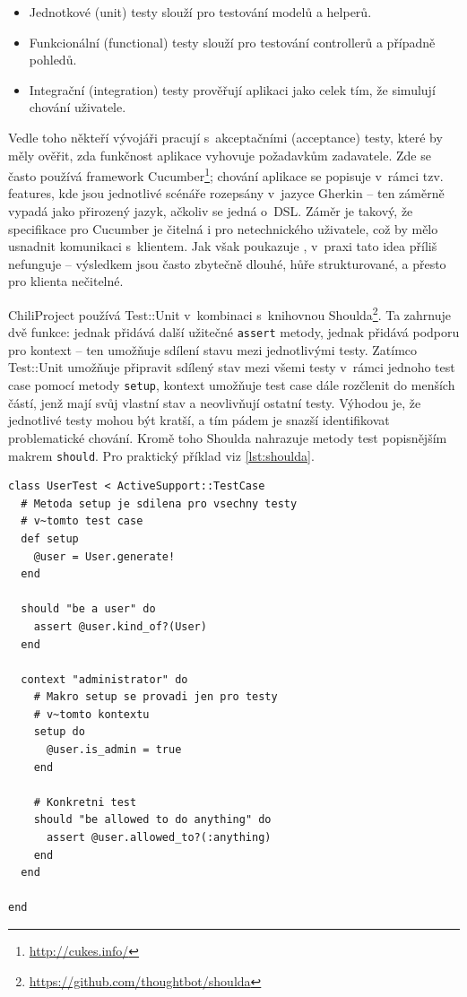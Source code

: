\documentclass[thesis=B,czech]{FITthesis}[2012/05/02]
\begin{document}
\begin{itemize}
\item
  Jednotkové (unit) testy slouží pro testování modelů a helperů.
\item
  Funkcionální (functional) testy slouží pro testování controllerů a
  případně pohledů.
\item
  Integrační (integration) testy prověřují aplikaci jako celek tím, že
  simulují chování uživatele.
\end{itemize}
Vedle toho někteří vývojáři pracují s~akceptačními (acceptance) testy,
které by měly ověřit, zda funkčnost aplikace vyhovuje požadavkům
zadavatele. Zde se často používá framework Cucumber\footnote{\url{http://cukes.info/}};
chování aplikace se popisuje v~rámci tzv. features, kde jsou jednotlivé
scénáře rozepsány v~jazyce Gherkin -- ten záměrně vypadá jako přirozený
jazyk, ačkoliv se jedná o~\gls{DSL}. Záměr je takový, že specifikace pro
Cucumber je čitelná i pro netechnického uživatele, což by mělo usnadnit
komunikaci s~klientem. Jak však poukazuje \citep{Kinsella2011}, v~praxi
tato idea příliš nefunguje -- výsledkem jsou často  zbytečně dlouhé, hůře strukturované, a přesto pro
klienta nečitelné.

ChiliProject používá Test::Unit v~kombinaci s~knihovnou
Shoulda\footnote{\url{https://github.com/thoughtbot/shoulda}}. Ta
zahrnuje dvě funkce: jednak přidává další užitečné \lstinline!assert!
metody, jednak přidává podporu pro kontext -- ten umožňuje sdílení stavu
mezi jednotlivými testy. Zatímco Test::Unit umožňuje připravit sdílený
stav mezi všemi testy v~rámci jednoho test case pomocí metody
\lstinline!setup!, kontext umožňuje test case dále rozčlenit do menších
částí, jenž mají svůj vlastní stav a neovlivňují ostatní testy. Výhodou je,
že jednotlivé testy mohou být kratší, a tím pádem je snazší
identifikovat problematické chování. Kromě toho Shoulda nahrazuje metody
test popisnějším makrem \lstinline!should!. Pro praktický příklad viz \autoref{lst:shoulda}.

\begin{lstlisting}[float,caption={Test case s~frameworky Test::Unit a Shoulda},label=lst:shoulda]
class UserTest < ActiveSupport::TestCase
  # Metoda setup je sdilena pro vsechny testy
  # v~tomto test case
  def setup
    @user = User.generate!
  end

  should "be a user" do
    assert @user.kind_of?(User)
  end

  context "administrator" do
    # Makro setup se provadi jen pro testy
    # v~tomto kontextu
    setup do
      @user.is_admin = true
    end

    # Konkretni test
    should "be allowed to do anything" do
      assert @user.allowed_to?(:anything)
    end
  end

end
\end{lstlisting}
\end{document}
